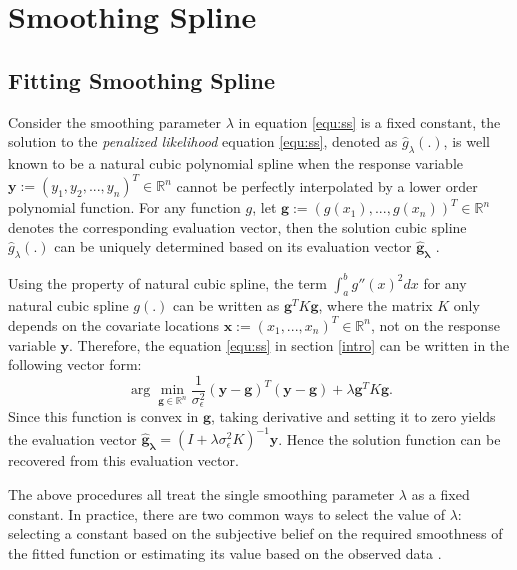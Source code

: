 \documentclass{article}
\begin{document}
\section{Smoothing Spline}\label{SmoothSpline}

\subsection{Fitting Smoothing Spline}

Consider the smoothing parameter $\lambda$ in equation \ref{equ:ss} is a fixed constant, the solution to the \textit{penalized likelihood} equation \ref{equ:ss}, denoted as $\hat{g}_\lambda(.)$, is well known to be a natural cubic polynomial spline when the response variable $\boldsymbol{y}:= (y_1, y_2, ..., y_n)^T \in \mathbb{R}^n$ cannot be perfectly interpolated by a lower order polynomial function. For any function $g$, let $\boldsymbol{g} := (g(x_1), ..., g(x_n))^T \in \mathbb{R}^n$ denotes the corresponding evaluation vector, then the solution cubic spline $\hat{g}_\lambda(.)$ can be uniquely determined based on its evaluation vector $\boldsymbol{\hat{g}_\lambda}$ \citep{smoothingspline}. 



Using the property of natural cubic spline, the term $\int_a^b g''(x)^2 dx$ for any natural cubic spline $g(.)$ can be written as $\boldsymbol{g}^T K \boldsymbol{g}$, where the matrix $K$ only depends on the covariate locations $\boldsymbol{x} := (x_1, ..., x_n)^T \in \mathbb{R}^n$, not on the response variable $\boldsymbol{y}$. Therefore, the equation \ref{equ:ss} in section \ref{intro} can be written in the following vector form:
\begin{equation}\label{equ:vectorss}
\arg\min_{\boldsymbol{g}\in \mathbb{R}^n} \frac{1}{ \sigma_\epsilon^2}(\boldsymbol{y} - \boldsymbol{g})^T (\boldsymbol{y} - \boldsymbol{g}) + \lambda \boldsymbol{g}^T K \boldsymbol{g}.
\end{equation}
Since this function is convex in $\boldsymbol{g}$, taking derivative and setting it to zero yields the evaluation vector $\boldsymbol{\hat{g}_\lambda} = (I+\lambda \sigma_\epsilon^2 K)^{-1} \boldsymbol{y}$. Hence the solution function can be recovered from this evaluation vector. 

The above procedures all treat the single smoothing parameter $\lambda$ as a fixed constant. In practice, there are two common ways to select the value of $\lambda$: selecting a constant based on the subjective belief on the required smoothness of the fitted function or estimating its value based on the observed data \citep{smoothingspline}. 
\end{document}
